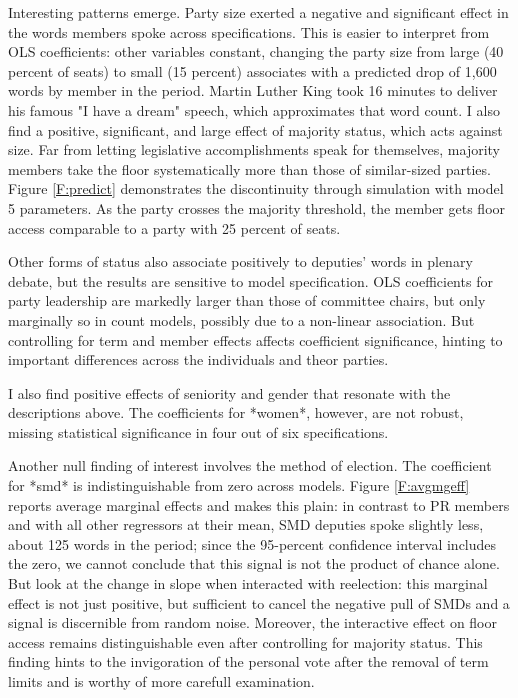 \documentclass[letter,12pt]{article}
\begin{document}
Interesting patterns emerge. Party size exerted a negative and significant effect in the words members spoke across specifications. This is easier to interpret from OLS coefficients: other variables constant, changing the party size from large (40 percent of seats) to small (15 percent) associates with a predicted drop of 1,600 words by member in the period. Martin Luther King took 16 minutes to deliver his famous "I have a dream" speech, which approximates that word count. I also find a positive, significant, and large effect of majority status, which acts against size. Far from letting legislative accomplishments speak for themselves, majority members take the floor systematically more than those of similar-sized parties. Figure \ref{F:predict} demonstrates the discontinuity through simulation with model 5 parameters. As the party crosses the majority threshold, the member gets floor access comparable to a party with 25 percent of seats.

Other forms of status also associate positively to deputies' words in plenary debate, but the results are sensitive to model specification. OLS coefficients for party leadership are markedly larger than those of committee chairs, but only marginally so in count models, possibly due to a non-linear association. But controlling for term and member effects affects coefficient significance, hinting to important differences across the individuals and theor parties. 

I also find positive effects of seniority and gender that resonate with the descriptions above. The coefficients for *women*, however, are not robust, missing statistical significance in four out of six specifications.

Another null finding of interest involves the method of election. The coefficient for *smd* is indistinguishable from zero across models. Figure \ref{F:avgmgeff} reports average marginal effects and makes this plain: in contrast to PR members and with all other regressors at their mean, SMD deputies spoke slightly less, about 125 words in the period; since the 95-percent confidence interval includes the zero, we cannot conclude that this signal is not the product of chance alone. But look at the change in slope when interacted with reelection: this marginal effect is not just positive, but sufficient to cancel the negative pull of SMDs and a signal is discernible from random noise. Moreover, the interactive effect on floor access remains distinguishable even after controlling for majority status. This finding hints to the invigoration of the personal vote after the removal of term limits and is worthy of more carefull examination. 
\end{document}
